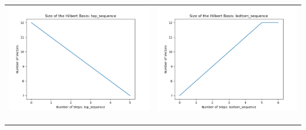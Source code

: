 \documentclass[10pt]{article}
\begin{document}
\begin{tabular}{c|c}
\begin{minipage}{.4\textwidth}
\includegraphics[width=\textwidth]{"DATA/5d/6 generators 1 bound E/top_sequence SIZE"}
\end{minipage} &
\begin{minipage}{.4\textwidth}
\includegraphics[width=\textwidth]{"DATA/5d/6 generators 1 bound E bottomup/bottom_sequence SIZE"}
\end{minipage} \\ \\
\hline \\\begin{minipage}{.4\textwidth}

\end{minipage}
\end{tabular}
\end{document}
